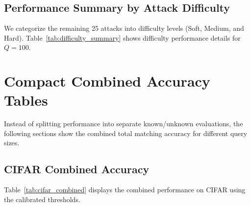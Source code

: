 \documentclass[11pt,a4paper]{article}
\begin{document}
\subsection{Performance Summary by Attack Difficulty}
We categorize the remaining 25 attacks into difficulty levels (Soft, Medium, and Hard). Table~\ref{tab:difficulty_summary} shows difficulty performance details for $Q=100$.

\begin{table}[htbp]
\centering
\caption{Performance Summary Grouped by Attack Difficulty ($Q=100$)}
\label{tab:difficulty_summary}
\end{table}

\section{Compact Combined Accuracy Tables}
Instead of splitting performance into separate known/unknown evaluations, the following sections show the combined total matching accuracy for different query sizes.

\begingroup
\setlength{\intextsep}{5pt plus 1pt minus 1pt}
\setlength{\textfloatsep}{5pt plus 1pt minus 1pt}
\setlength{\abovecaptionskip}{2pt}
\setlength{\belowcaptionskip}{2pt}

\subsection{CIFAR Combined Accuracy}
Table~\ref{tab:cifar_combined} displays the combined performance on CIFAR using the calibrated thresholds.
\end{document}

